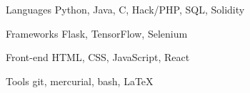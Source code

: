 

\begin{cvskills}


  \cvskill
    {Languages} %
    {Python, Java, C, Hack/PHP, SQL, Solidity} %

  \cvskill
    {Frameworks} %
    {Flask, TensorFlow, Selenium} %

  \cvskill
    {Front-end} %
    {HTML, CSS, JavaScript, React} %

  \cvskill
    {Tools} %
    {git, mercurial, bash, \LaTeX} %

\end{cvskills}
